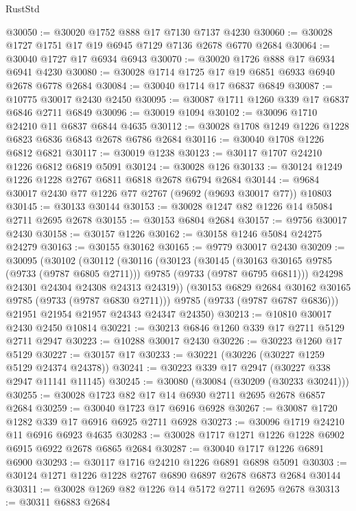 \begin{lexlean}{RustStd}
\begin{coremodule}
{\begin{coremodule}
{{{{{{{{{{{{{{{{{{{{{{{{{{{{{{{{{{{{{{{{{{{{{{{{{{{{{{{@30050 := @30020 @1752 @888 @17 @7130 @7137 @4230
@30060 := @30028 @1727 @1751 @17 @19 @6945 @7129 @7136 @2678 @6770 @2684
@30064 := @30040 @1727 @17 @6934 @6943
@30070 := @30020 @1726 @888 @17 @6934 @6941 @4230
@30080 := @30028 @1714 @1725 @17 @19 @6851 @6933 @6940 @2678 @6778 @2684
@30084 := @30040 @1714 @17 @6837 @6849
@30087 := @10775 @30017 @2430 @2450
@30095 := @30087 @1711 @1260 @339 @17 @6837 @6846 @2711 @6849
@30096 := @30019 @1094
@30102 := @30096 @1710 @24210 @11 @6837 @6844 @4635
@30112 := @30028 @1708 @1249 @1226 @1228 @6823 @6836 @6843 @2678 @6786 @2684
@30116 := @30040 @1708 @1226 @6812 @6821
@30117 := @30019 @1238
@30123 := @30117 @1707 @24210 @1226 @6812 @6819 @5091
@30124 := @30028 @126
@30133 := @30124 @1249 @1226 @1228 @2767 @6811 @6818 @2678 @6794 @2684
@30144 := @9684 @30017 @2430 @77 @1226 @77 @2767 (@9692 (@9693 @30017 @77)) @10803
@30145 := @30133 @30144
@30153 := @30028 @1247 @82 @1226 @14 @5084 @2711 @2695 @2678
@30155 := @30153 @6804 @2684
@30157 := @9756 @30017 @2430
@30158 := @30157 @1226
@30162 := @30158 @1246 @5084 @24275 @24279
@30163 := @30155 @30162
@30165 := @9779 @30017 @2430
@30209 := @30095
    (@30102
      (@30112
        (@30116
          (@30123
            (@30145
              (@30163 @30165 @9785 (@9733 (@9787 @6805 @2711)))
              @9785
              (@9733 (@9787 @6795 @6811)))
            @24298
            @24301
            @24304
            @24308
            @24313
            @24319))
        (@30153 @6829 @2684 @30162 @30165 @9785 (@9733 (@9787 @6830 @2711)))
        @9785
        (@9733 (@9787 @6787 @6836)))
      @21951
      @21954
      @21957
      @24343
      @24347
      @24350)
@30213 := @10810 @30017 @2430 @2450 @10814
@30221 := @30213 @6846 @1260 @339 @17 @2711 @5129 @2711 @2947
@30223 := @10288 @30017 @2430
@30226 := @30223 @1260 @17 @5129
@30227 := @30157 @17
@30233 := @30221 (@30226 (@30227 @1259 @5129 @24374 @24378))
@30241 := @30223 @339 @17 @2947 (@30227 @338 @2947 @11141 @11145)
@30245 := @30080 (@30084 (@30209 (@30233 @30241)))
@30255 := @30028 @1723 @82 @17 @14 @6930 @2711 @2695 @2678 @6857 @2684
@30259 := @30040 @1723 @17 @6916 @6928
@30267 := @30087 @1720 @1282 @339 @17 @6916 @6925 @2711 @6928
@30273 := @30096 @1719 @24210 @11 @6916 @6923 @4635
@30283 := @30028 @1717 @1271 @1226 @1228 @6902 @6915 @6922 @2678 @6865 @2684
@30287 := @30040 @1717 @1226 @6891 @6900
@30293 := @30117 @1716 @24210 @1226 @6891 @6898 @5091
@30303 := @30124 @1271 @1226 @1228 @2767 @6890 @6897 @2678 @6873 @2684 @30144
@30311 := @30028 @1269 @82 @1226 @14 @5172 @2711 @2695 @2678
@30313 := @30311 @6883 @2684
}}}}}}}}}}}}}}}}}}}}}}}}}}}}}}}}}}}}}}}}}}}}}}}}}}}}}}}
\end{coremodule}}
\end{coremodule}
\end{lexlean}
